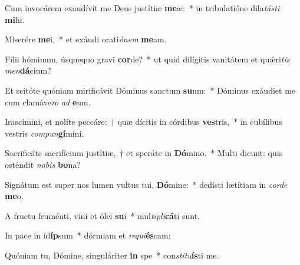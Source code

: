 \item Cum invocárem exaudívit me Deus justítiæ \textbf{me}æ:~* in tribulatióne dila\textit{tás}\textit{ti} \textbf{mi}hi.
\item Miserére \textbf{me}i,~* et exáudi orati\textit{ó}\textit{nem} \textbf{me}am.
\item Fílii hóminum, úsquequo gravi \textbf{cor}de?~* ut quid dilígitis vanitátem et quǽri\textit{tis} \textit{men}\textbf{dá}cium?
\item Et scitóte quóniam mirificávit Dóminus sanctum \textbf{su}um:~* Dóminus exáudiet me cum clamáve\textit{ro} \textit{ad} \textbf{e}um.
\item Irascímini, et nolíte peccáre:~† quæ dícitis in córdibus \textbf{ves}tris,~* in cubílibus vestris \textit{com}\textit{pun}\textbf{gí}mini.
\item Sacrificáte sacrifícium justítiæ,~† et speráte in \textbf{Dó}mino.~* Multi dicunt: quis osténdit \textit{no}\textit{bis} \textbf{bo}na?
\item Signátum est super nos lumen vultus tui, \textbf{Dó}mine:~* dedísti lætítiam in \textit{cor}\textit{de} \textbf{me}o.
\item A fructu fruménti, vini et ólei \textbf{su}i~* mul\textit{ti}\textit{pli}\textbf{cá}ti sunt.
\item In pace in id\textbf{íp}sum~* dórmiam et \textit{re}\textit{qui}\textbf{és}cam;
\item Quóniam tu, Dómine, singuláriter \textbf{in} spe~* con\textit{sti}\textit{tu}\textbf{ís}ti me.
